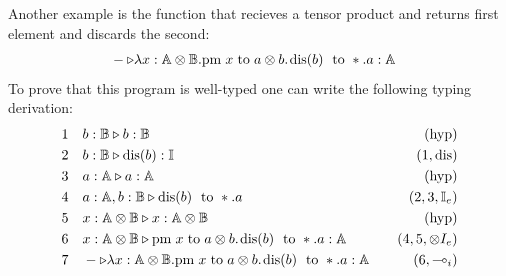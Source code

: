 Another example is the function that recieves a tensor product and returns first element and discards the second:
\begin{equation*}
\begin{split}
& - \triangleright \lambda x: \mathbb{A \otimes B}. \text{pm} \hspace{3 pt} x \hspace{3 pt} \text{to} \hspace{3 pt} a \otimes b. \hspace{1 pt} \text{dis}(b) \hspace{3 pt} \text{ to } *.a: \mathbb{A}
\end{split}
\end{equation*}
To prove that this program is well-typed one can write the following typing derivation:
\begin{equation*}
\begin{split}
1  \hspace{10 pt} & b : \mathbb{B} \triangleright b : \mathbb{B}  \hspace{10 pt} & {(\text{hyp})} \\
2 \hspace{10 pt} & b : \mathbb{B} \triangleright \text{dis}(b): \mathbb{I} \hspace{10 pt} & {(1,\text{dis})} \\
3 \hspace{10 pt} & a : \mathbb{A} \triangleright a : \mathbb{A}  \hspace{10 pt} & {(\text{hyp})} \\
4 \hspace{10 pt} &  a : \mathbb{A}, b : \mathbb{B}  \triangleright \text{dis}(b) \hspace{3 pt} \text{ to } *.a  & {(2,3,\mathbb{I}_{e})} \\
5 \hspace{10 pt} & x : \mathbb{A \otimes B} \triangleright x : \mathbb{A \otimes B}  \hspace{10 pt} & {(\text{hyp})} \\
6 \hspace{10 pt} & x : \mathbb{A \otimes B} \triangleright \text{pm} \hspace{3 pt} x \hspace{3 pt} \text{to} \hspace{3 pt} a \otimes b. \hspace{1 pt} \text{dis}(b) \hspace{3 pt} \text{ to } *.a : \mathbb{A} \hspace{10pt} & \text{($4,5,\otimes{I}_{e}$)} \\
7 \hspace{10 pt} & - \triangleright \lambda x: \mathbb{A \otimes B}. \text{pm} \hspace{3 pt} x \hspace{3 pt} \text{to} \hspace{3 pt} a \otimes b. \hspace{1 pt} \text{dis}(b) \hspace{3 pt} \text{ to } *.a: \mathbb{A} \hspace{10pt} & \text{($6,\multimap_i$)}
\end{split}
\end{equation*}


